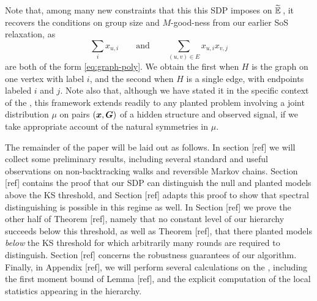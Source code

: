 Note that, among many new constraints that this this SDP imposes on $\widetilde{\operatorname*{\mathbb{E}}}\,$, it recovers the conditions on group size and $M$-good-ness from our earlier SoS relaxation, as
$$
	\sum_i x_{u,i}\qquad \text{and} \qquad \sum_{(u,v)\in E} x_{u,i}x_{v,j}
$$
are both of the form \eqref{eq:graph-poly}. We obtain the first when $H$ is the graph on one vertex with label $i$, and the second when $H$ is a single edge, with endpoints labeled $i$ and $j$. Note also that, although we have stated it in the specific context of the \model, this framework extends readily to any planted problem involving a joint distribution $\mu$ on pairs $({\boldsymbol{x}},\boldsymbol{G})$ of a hidden structure and observed signal, if we take appropriate account of the natural symmetries in $\mu$.

The remainder of the paper will be laid out as follows. In section [ref] we will collect some preliminary results, including several standard and useful observations on non-backtracking walks and reversible Markov chains. Section [ref] contains the proof that our SDP can distinguish the null and planted models above the KS threshold, and Section [ref] adapts this proof to show that spectral distinguishing is possible in this regime as well. In Section [ref] we prove the other half of Theorem [ref], namely that no constant level of our hierarchy succeeds below this threshold, as well as Theorem [ref], that there planted models \textit{below} the KS threshold for which arbitrarily many rounds are required to distinguish. Section [ref] concerns the robustness guarantees of our algorithm. Finally, in Appendix [ref], we will perform several calculations on the \model, including the first moment bound of Lemma [ref], and the explicit computation of the local statistics appearing in the  hierarchy.





